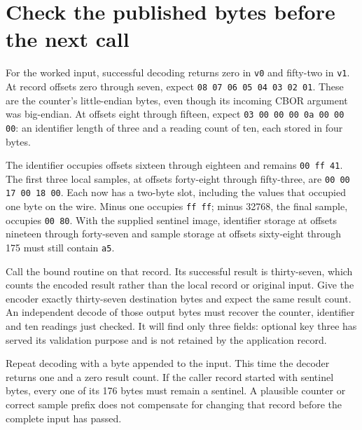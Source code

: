 \section{Check the published bytes before the next call}
For the worked input, successful decoding returns zero in \texttt{v0} and fifty-two
in \texttt{v1}. At record offsets zero through seven, expect
\texttt{08 07 06 05 04 03 02 01}. These are the counter's little-endian bytes, even
though its incoming CBOR argument was big-endian. At offsets eight through fifteen,
expect \texttt{03 00 00 00 0a 00 00 00}: an identifier length of three and a reading
count of ten, each stored in four bytes.

The identifier occupies offsets sixteen through eighteen and remains
\texttt{00 ff 41}. The first three local samples, at offsets forty-eight through
fifty-three, are \texttt{00 00 17 00 18 00}. Each now has a two-byte slot, including
the values that occupied one byte on the wire. Minus one occupies \texttt{ff ff};
minus 32768, the final sample, occupies \texttt{00 80}. With the supplied sentinel
image, identifier storage at offsets nineteen through forty-seven and sample storage
at offsets sixty-eight through 175 must still contain \texttt{a5}.

Call the bound routine on that record. Its successful result is thirty-seven, which
counts the encoded result rather than the local record or original input. Give the
encoder exactly thirty-seven destination bytes and expect the same result count.
An independent decode of those output bytes must recover the counter, identifier and
ten readings just checked. It will find only three fields: optional key three has
served its validation purpose and is not retained by the application record.

Repeat decoding with a byte appended to the input. This time the decoder returns one
and a zero result count. If the caller record started with sentinel bytes, every one
of its 176 bytes must remain a sentinel. A plausible counter or correct sample prefix
does not compensate for changing that record before the complete input has passed.
